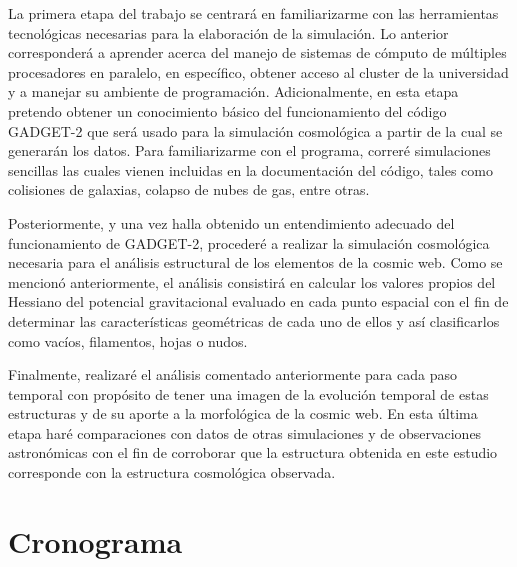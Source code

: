 \documentclass{article}
\begin{document}
La primera etapa del trabajo se centrará en familiarizarme con las herramientas tecnológicas necesarias para la elaboración de la simulación. Lo anterior corresponderá a aprender acerca del manejo de sistemas de cómputo de múltiples procesadores en paralelo, en específico, obtener acceso al cluster de la universidad y a manejar su ambiente de programación. Adicionalmente, en esta etapa pretendo obtener un conocimiento básico del funcionamiento del código GADGET-2 que será usado para la simulación cosmológica a partir de la cual se generarán los datos. Para familiarizarme con el programa, correré simulaciones sencillas las cuales vienen incluidas en la documentación del código, tales como colisiones de galaxias, colapso de nubes de gas, entre otras. 

Posteriormente, y una vez halla obtenido un entendimiento adecuado del funcionamiento de GADGET-2, procederé a realizar la simulación cosmológica necesaria para el análisis estructural de los elementos de la cosmic web. Como se mencionó anteriormente, el análisis consistirá en calcular los valores propios del Hessiano del potencial gravitacional evaluado en cada punto espacial con el fin de determinar las características geométricas de cada uno de ellos y así clasificarlos como vacíos, filamentos, hojas o nudos.

Finalmente, realizaré el análisis comentado anteriormente para cada paso temporal con propósito de tener una imagen de la evolución temporal de estas estructuras y de su aporte a la morfológica de la cosmic web. En esta última etapa haré comparaciones con datos de otras simulaciones y de observaciones astronómicas con el fin de corroborar que la estructura obtenida en este estudio corresponde con la estructura cosmológica observada.         


\section{Cronograma}
\end{document}
